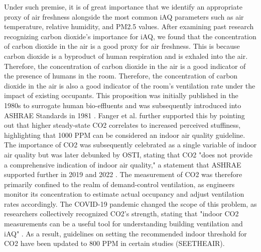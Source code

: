 Under such premise, it is of great importance that we identify an appropriate proxy of air freshness alongside the most common iAQ parameters such as air temperature, relative humidity, and PM2.5 values. After examining past research recognizing carbon dioxide's importance for iAQ, we found that the concentration of carbon dioxide in the air is a good proxy for air freshness. This is because carbon dioxide is a byproduct of human respiration and is exhaled into the air. Therefore, the concentration of carbon dioxide in the air is a good indicator of the presence of humans in the room. Therefore, the concentration of carbon dioxide in the air is also a good indicator of the room's ventilation rate under the impact of existing occupants. This proposition was initially published in the 1980s to surrogate human bio-effluents and was subsequently introduced into ASHRAE Standards in 1981 \cite{ashrae1981}. Fanger et al. further supported this by pointing out that higher steady-state CO2 correlates to increased perceived stuffiness, highlighting that 1000 PPM can be considered an indoor air quality guideline. The importance of CO2 was subsequently celebrated as a single variable of indoor air quality but was later debunked by OSTI, stating that CO2 "does not provide a comprehensive indication of indoor air quality," a statement that ASHRAE supported further in 2019 and 2022 \cite{ashrae2022}. The measurement of CO2 was therefore primarily confined to the realm of demand-control ventilation, as engineers monitor its concentration to estimate actual occupancy and adjust ventilation rates accordingly. The COVID-19 pandemic changed the scope of this problem, as researchers collectively recognized CO2's strength, stating that "indoor CO2 measurements can be a useful tool for understanding building ventilation and iAQ" \cite{ashrae2022}. As a result, guidelines on setting the recommended indoor threshold for CO2 have been updated to 800 PPM in certain studies (SEETHEAIR).

